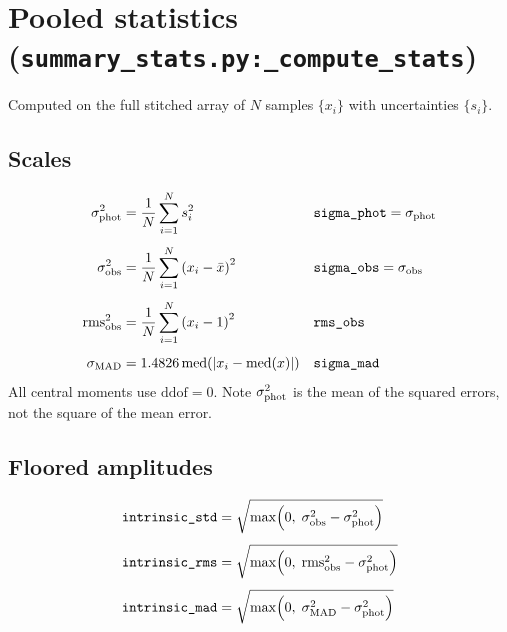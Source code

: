 \documentclass[11pt]{article}
\begin{document}
\section{Pooled statistics (\texttt{summary\_stats.py:\_compute\_stats})}

Computed on the full stitched array of $N$ samples $\{x_i\}$ with uncertainties
$\{s_i\}$.

\subsection{Scales}

\begin{align}
  \sigma_{\rm phot}^{2} &= \frac{1}{N}\sum_{i=1}^{N} s_i^{2}
  && \texttt{sigma\_phot} = \sigma_{\rm phot}
  \label{eq:sigphot}\\[4pt]
  \sigma_{\rm obs}^{2}  &= \frac{1}{N}\sum_{i=1}^{N}\left(x_i - \bar{x}\right)^{2}
  && \texttt{sigma\_obs} = \sigma_{\rm obs}
  \label{eq:sigobs}\\[4pt]
  \mathrm{rms}_{\rm obs}^{2} &= \frac{1}{N}\sum_{i=1}^{N}\left(x_i - 1\right)^{2}
  && \texttt{rms\_obs}
  \label{eq:rmsobs}\\[4pt]
  \sigma_{\rm MAD} &= 1.4826\,\mathrm{med}\!\left(\left|x_i - \mathrm{med}(x)\right|\right)
  && \texttt{sigma\_mad}
  \label{eq:sigmad}
\end{align}
%
All central moments use $\mathrm{ddof}=0$. Note $\sigma_{\rm phot}^2$ is the mean of the
squared errors, not the square of the mean error.

\subsection{Floored amplitudes}

\begin{align}
  \texttt{intrinsic\_std} &= \sqrt{\max\!\left(0,\;
      \sigma_{\rm obs}^{2} - \sigma_{\rm phot}^{2}\right)}
  \label{eq:istd}\\[4pt]
  \texttt{intrinsic\_rms} &= \sqrt{\max\!\left(0,\;
      \mathrm{rms}_{\rm obs}^{2} - \sigma_{\rm phot}^{2}\right)}
  \label{eq:irms}\\[4pt]
  \texttt{intrinsic\_mad} &= \sqrt{\max\!\left(0,\;
      \sigma_{\rm MAD}^{2} - \sigma_{\rm phot}^{2}\right)}
  \label{eq:imad}
\end{align}
\end{document}
